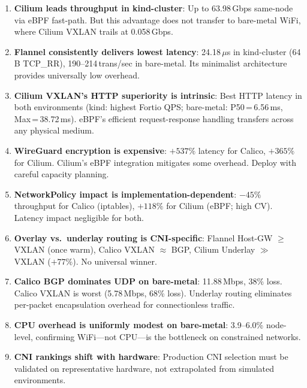 \documentclass[11pt,a4paper]{article}
\begin{document}
\begin{enumerate}
  \item \textbf{Cilium leads throughput in kind-cluster}: Up to 63.98\,Gbps same-node via eBPF fast-path. But this advantage does not transfer to bare-metal WiFi, where Cilium VXLAN trails at 0.058\,Gbps.

  \item \textbf{Flannel consistently delivers lowest latency}: 24.18\,$\mu$s in kind-cluster (64\,B TCP\_RR), 190--214\,trans/sec in bare-metal. Its minimalist architecture provides universally low overhead.

  \item \textbf{Cilium VXLAN's HTTP superiority is intrinsic}: Best HTTP latency in both environments (kind: highest Fortio QPS; bare-metal: P50\,=\,6.56\,ms, Max\,=\,38.72\,ms). eBPF's efficient request-response handling transfers across any physical medium.

  \item \textbf{WireGuard encryption is expensive}: $+537\%$ latency for Calico, $+365\%$ for Cilium. Cilium's eBPF integration mitigates some overhead. Deploy with careful capacity planning.

  \item \textbf{NetworkPolicy impact is implementation-dependent}: $-45\%$ throughput for Calico (iptables), $+118\%$ for Cilium (eBPF; high CV). Latency impact negligible for both.

  \item \textbf{Overlay vs.\ underlay routing is CNI-specific}: Flannel Host-GW $\geq$ VXLAN (once warm), Calico VXLAN $\approx$ BGP, Cilium Underlay $\gg$ VXLAN ($+77\%$). No universal winner.

  \item \textbf{Calico BGP dominates UDP on bare-metal}: 11.88\,Mbps, 38\% loss. Calico VXLAN is worst (5.78\,Mbps, 68\% loss). Underlay routing eliminates per-packet encapsulation overhead for connectionless traffic.

  \item \textbf{CPU overhead is uniformly modest on bare-metal}: 3.9--6.0\% node-level, confirming WiFi---not CPU---is the bottleneck on constrained networks.

  \item \textbf{CNI rankings shift with hardware}: Production CNI selection must be validated on representative hardware, not extrapolated from simulated environments.
\end{enumerate}
\end{document}

